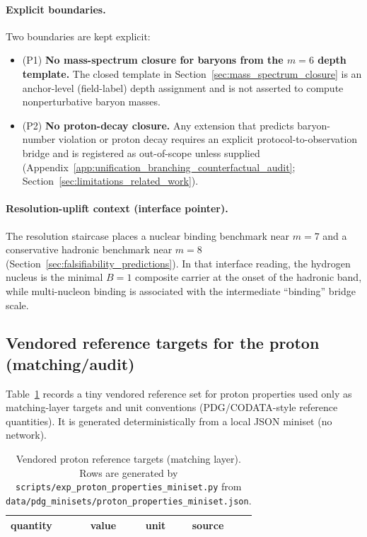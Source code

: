 \paragraph{Explicit boundaries.}
\AuditTag Two boundaries are kept explicit:
\begin{itemize}
\item (P1) \textbf{No mass-spectrum closure for baryons from the $m=6$ depth template.}
The closed template in Section~\ref{sec:mass_spectrum_closure} is an anchor-level (field-label) depth assignment and is not asserted to compute nonperturbative baryon masses.
\item (P2) \textbf{No proton-decay closure.}
Any extension that predicts baryon-number violation or proton decay requires an explicit protocol-to-observation bridge and is registered as out-of-scope unless supplied (Appendix~\ref{app:unification_branching_counterfactual_audit}; Section~\ref{sec:limitations_related_work}).
\end{itemize}

\paragraph{Resolution-uplift context (interface pointer).}
\InterfaceTag The resolution staircase places a nuclear binding benchmark near $m=7$ and a conservative hadronic benchmark near $m=8$ (Section~\ref{sec:falsifiability_predictions}).
In that interface reading, the hydrogen nucleus is the minimal $B=1$ composite carrier at the onset of the hadronic band, while multi-nucleon binding is associated with the intermediate ``binding'' bridge scale.

\subsection{Vendored reference targets for the proton (matching/audit)}
\label{subsec:proton_properties_miniset}
\MatchTag Table~\ref{tab:proton_properties_miniset} records a tiny vendored reference set for proton properties used only as matching-layer targets and unit conventions (PDG/CODATA-style reference quantities). It is generated deterministically from a local JSON miniset (no network).

\AuditTag %

\begin{table}[t]
\centering
\small
\setlength{\tabcolsep}{8pt}
\renewcommand{\arraystretch}{1.15}
\begin{tabular}{llll}
\toprule
quantity & value & unit & source \\
\midrule

\end{tabular}
\caption{Vendored proton reference targets (matching layer). Rows are generated by \texttt{scripts/exp\_proton\_properties\_miniset.py} from \texttt{data/pdg\_minisets/proton\_properties\_miniset.json}.}
\label{tab:proton_properties_miniset}
\end{table}

